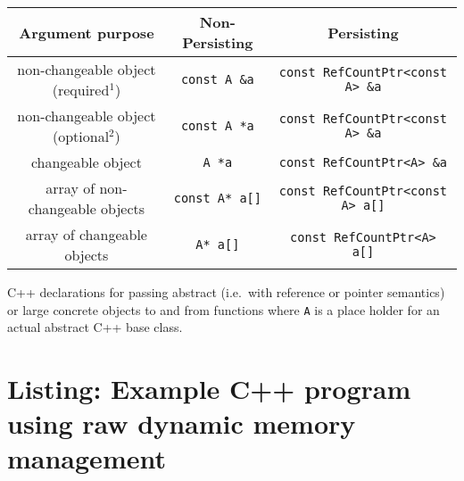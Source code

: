 \documentclass[pdf,ps2pdf,11pt]{SANDreport}
\begin{document}
\begin{center}
\begin{minipage}{{}\textwidth}
\begin{tabular}{|c|c|c|}
\hline
Argument purpose
& Non-Persisting
& Persisting \\
\hline
\hline
non-changeable object (required$^1$)
& {}\texttt{const A \&a}
& {}\texttt{const RefCountPtr<const A> \&a} \\
\hline
non-changeable object (optional$^2$)
& {}\texttt{const A *a}
& {}\texttt{const RefCountPtr<const A> \&a} \\
\hline
changeable object
& {}\texttt{A *a}
& {}\texttt{const RefCountPtr<A> \&a} \\
\hline
array of non-changeable objects
& {}\texttt{const A* a[]}
& {}\texttt{const RefCountPtr<const A> a[]} \\
\hline
array of changeable objects
& {}\texttt{A* a[]}
& {}\texttt{const RefCountPtr<A> a[]} \\
\hline
\end{tabular}
\begin{center}
C++ declarations for passing abstract (i.e.~with reference or pointer
semantics) or large concrete objects to and from functions where
{}\texttt{A} is a place holder for an actual abstract C++ base class.
\end{center}
\end{minipage}
\end{center}

%
\section{Listing: Example C++ program using raw dynamic memory management}
\label{rcpqs:apdx:ex-prg}
%
\end{document}
